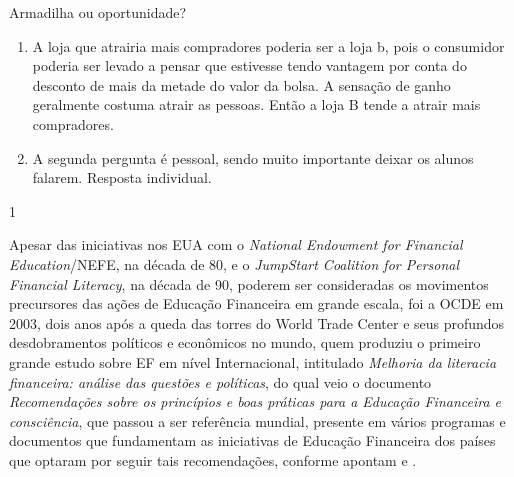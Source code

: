 \marginpar{\vspace{.05em}}
\begin{answer}{Armadilha ou oportunidade?}
{
\begin{enumerate}
\item A loja que atrairia mais compradores poderia ser a loja b, pois o consumidor poderia ser levado a pensar que estivesse tendo vantagem por conta do desconto de mais da metade do valor da bolsa. A sensação de ganho geralmente costuma atrair as pessoas. Então a loja B tende a atrair mais compradores. 

\item A segunda pergunta é pessoal, sendo muito importante deixar os alunos falarem. Resposta individual.

\end{enumerate}
}{1}
\end{answer}

\begin{knowledge}
Apesar das iniciativas nos EUA com o \textit{National Endowment for Financial Education}/NEFE, na década de 80, e o \textit{JumpStart Coalition for Personal Financial Literacy}, na década de 90, poderem ser consideradas os movimentos precursores das ações de Educação Financeira em grande escala, foi a OCDE em 2003, dois anos após a queda das torres do World Trade Center e seus profundos desdobramentos políticos e econômicos no mundo, quem produziu o primeiro grande estudo sobre EF em nível Internacional, intitulado \textit{Melhoria da literacia financeira: análise das questões e políticas}, do qual veio o documento \textit{Recomendações sobre os princípios e boas práticas para a Educação Financeira e consciência}, que passou a ser referência mundial, presente em vários programas e documentos que fundamentam as iniciativas de Educação Financeira dos países que optaram por seguir tais recomendações, conforme apontam \cite{silva2013} e \cite{muniz2016b}.
\end{knowledge}


